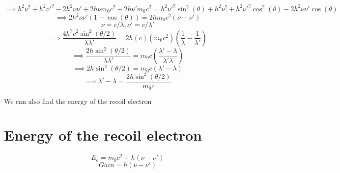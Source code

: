 \documentclass{article}
\begin{document}
\begin{equation}
\implies h^2\nu^2+ h^2\nu'^2 -2h^2\nu\nu' + 2h\nu m_0c^2 - 2h\nu'm_0c^2 = h^2\nu'^2\sin^2(\theta) + h^2\nu^2 +h^2\nu'^2\cos^2(\theta) - 2h^2\nu\nu'\cos(\theta)
\end{equation}
\begin{equation}
\implies 2h^2\nu\nu' (1-\cos(\theta)) = 2hm_0c^2 (\nu-\nu')
\end{equation}
\begin{equation}
\nu = c/\lambda , \nu' = c/\lambda'
\end{equation}
\begin{equation}
\implies \frac{4h^2c^2\sin^2(\theta/2)}{\lambda\lambda'} = 2h(c)(m_0c^2)(\frac{1}{\lambda}-\frac{1}{\lambda'})
\end{equation}
\begin{equation}
\implies \frac{2h\sin^2(\theta/2)}{\lambda\lambda'} = m_0c(\frac{\lambda' - \lambda}{\lambda'\lambda})
\end{equation}
\begin{equation}
\implies 2h\sin^2(\theta/2) = m_0c (\lambda' - \lambda)
\end{equation}
\begin{equation}
\implies \lambda'-\lambda = \frac{2h\sin^2(\theta/2)}{m_0c}
\end{equation}
\begin{flushleft}
We can also find the energy of the recoil electron
\end{flushleft}
\section{Energy of the recoil electron}
\begin{equation}
E_e = m_0c^2 + h(\nu-\nu')
\end{equation}
\begin{equation}
Gain = h(\nu-\nu')
\end{equation}
\end{document}
